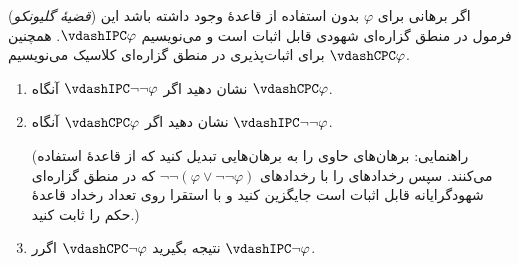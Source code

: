 (\emph{قضیهٔ گلیونکو})
اگر برهانی برای $\varphi$ بدون استفاده از قاعدهٔ  وجود داشته باشد این فرمول در منطق گزاره‌ای شهودی قابل اثبات است و می‌نویسیم $\vdashIPC\varphi$. همچنین برای اثبات‌پذیری در منطق گزاره‌ای کلاسیک می‌نویسیم $\vdashCPC\varphi$.
\begin{enumerate}[label=(\alph*)]
        \item 
    نشان دهید اگر
    $\vdashIPC\neg\neg\varphi$
    آنگاه
    $\vdashCPC\varphi$.
    \item 
    نشان دهید اگر
    $\vdashCPC\varphi$
    آنگاه
    $\vdashIPC\neg\neg\varphi$.

    (راهنمایی: برهان‌های حاوی
    را به برهان‌هایی تبدیل کنید که از قاعدهٔ
    استفاده می‌کنند. سپس رخدادهای
    را با رخدادهای
    $\neg\neg(\varphi\vee\neg\neg\varphi)$
    که در منطق گزاره‌ای شهودگرایانه قابل اثبات است جایگزین کنید و با استقرا روی تعداد رخداد قاعدهٔ
    حکم را ثابت کنید.)
    \item نتیجه بگیرید
    $\vdashCPC\neg\varphi$ اگرر $\vdashIPC\neg\varphi$.
\end{enumerate}\quad

